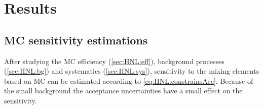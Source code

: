 \documentclass[../main.tex]{subfiles}
\begin{document}
\section{Results}
\subsection{MC sensitivity estimations}
\label{sec:HNL:MCres}

After studying the MC efficiency (\autoref{sec:HNL:eff}), background processes (\autoref{sec:HNL:bg}) and systematics (\autoref{sec:HNL:sys}),  sensitivity to the mixing elements based on MC can be estimated according to \autoref{eq:HNL:constrainsAcc}. Because of the small background the acceptance uncertainties have a small effect on the sensitivity.

\begin{comment}
\begin{figure}[!ht]
    \begin{center}
  \begin{minipage}{0.49\linewidth}
    \centering{\texttt{[image: Ue2fullMC]}  \\  $K^+\to e(e\pi)$}
  \end{minipage}
  \hfill
  \begin{minipage}{0.49\linewidth}
    \centering{\texttt{[image: Umu2fullMC]}  \\  $K^+\to \mu(\mu\pi)$}
  \end{minipage}
  \caption{Sensitivity to mixing elements $\left|Ue\right|^2, \left|U\mu\right|^2$ based on MC samples analysis}
  \label{fig:HNL:LimitsMC1}
    \end{center}
\end{figure}

\begin{figure}[!ht]
    \begin{center}
  \begin{minipage}{0.49\linewidth}
    \centering{\texttt{[image: UeUmufullMC]}  \\  $K^+\to \mu(e\pi)$ and $K^+\to e(\mu\pi)$}
  \end{minipage}
  \begin{minipage}{0.49\linewidth}
    \centering{\texttt{[image: UeMixfullMC]}  \\  $K^+\to e(\mu\mu\nu)$}
  \end{minipage}
  \caption{Sensitivity to mixing elements $\left|UeU\mu\right|$ and $\left|U_{e}\right|\sqrt{\left|U_{e}\right|^2+\left|U_{\tau}\right|^2}$ based on MC samples analysis.}
  \label{fig:HNL:LimitsMC2}
  \end{center}
\end{figure}

As one can see the improvements of PS191 limits can be obtained with the current statistics.

\section{Data unblinding}
\end{comment}
\end{document}
